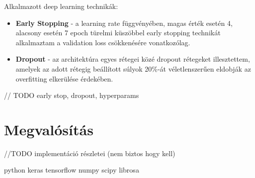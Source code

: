 Alkalmazott deep learning technikák:
\begin{itemize}
 \item \textbf{Early Stopping} - a learning rate függvényében, magas érték esetén 4, alacsony esetén 7 epoch türelmi küszöbbel early stopping technikát alkalmaztam a validation loss csökkenésére vonatkozólag. 
 \item \textbf{Dropout} - az architektúra egyes rétegei közé dropout rétegeket illesztettem, amelyek az adott rétegig beállított súlyok 20\%-át véletlenszerűen eldobják az overfitting elkerülése érdekében.
\end{itemize}
// TODO  early stop, dropout, hyperparams

\section{Megvalósítás}

//TODO implementáció részletei (nem biztos hogy kell)

python keras tensorflow numpy scipy librosa 